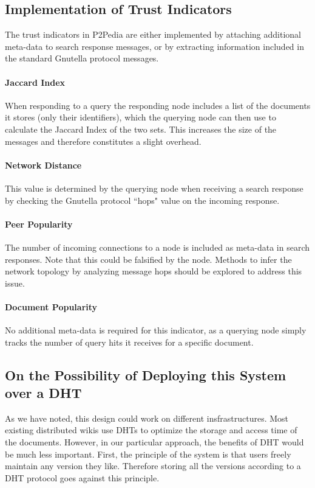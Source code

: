 \subsection{Implementation of Trust Indicators}

The trust indicators in P2Pedia are either implemented by attaching additional meta-data to search response messages, or by extracting information included in the standard Gnutella protocol messages.
\paragraph*{Jaccard Index} When responding to a query the responding node includes a list of the documents it stores (only their identifiers), which the querying node can then use to calculate the Jaccard Index of the two sets. This increases the size of the messages and therefore constitutes a slight overhead.
\paragraph*{Network Distance} This value is determined by the querying node when receiving a search response by checking the Gnutella protocol ``hops" value on the incoming response. 
\paragraph*{Peer Popularity} The number of incoming connections to a node is included as meta-data in search responses. Note that this could be falsified by the node. Methods to infer the network topology by analyzing message hops should be explored to address this issue.
\paragraph*{Document Popularity} No additional meta-data is required for this indicator, as a querying node simply tracks the number of query hits it receives for a specific document. 

\subsection{On the Possibility of Deploying this System over a DHT}
As we have noted, this design could work on different insfrastructures. Most existing distributed wikis use DHTs to optimize the storage and access time of the documents. However, in our particular approach, the benefits of DHT would be much less important.
First, the principle of the system is that users freely maintain any version they like. Therefore storing all the versions according to a DHT protocol goes against this principle.

